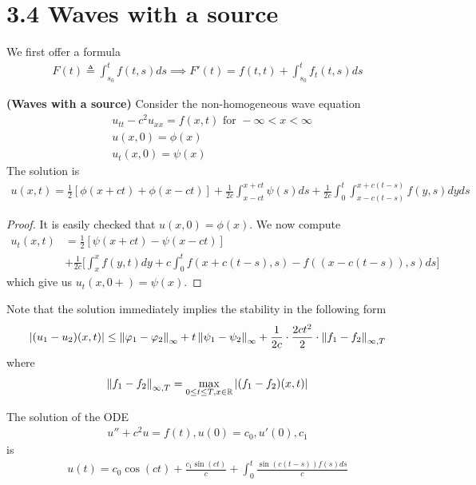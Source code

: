\documentclass{report}
\begin{document}
\section{3.4 Waves with a source}
\begin{mdframed}
We first offer a formula  
\begin{align*}
F(t)\triangleq \int_{s_0}^tf(t,s)ds \implies F'(t)= f(t,t)+ \int_{s_0}^t f_t(t,s)ds
\end{align*}
\end{mdframed}
\begin{theorem}
\textbf{(Waves with a source)} Consider the non-homogeneous wave equation  
\begin{align*}
&u_{tt}-c^2u_{xx}=f(x,t)\text{ for }-\infty < x< \infty\\
&u(x,0)= \phi (x) \\
&u_t(x,0)=\psi (x)
\end{align*}
The solution is 
\begin{align*}
u(x,t)= \frac{1}{2}[\phi (x+ct)+ \phi (x-ct)] + \frac{1}{2c}\int_{x-ct}^{x+ct}\psi (s)ds + \frac{1}{2c}\int_0^t \int_{x-c(t-s)}^{x+c(t-s)}f(y,s)dyds
\end{align*}
\end{theorem}
\begin{proof}
It is easily checked that $u(x,0)=\phi (x)$. We now compute 
\begin{align*}
  u_t(x,t)&=\frac{1}{2}[\psi (x+ct)- \psi (x-ct)]\\
  &+ \frac{1}{2c}\Big[\int^{x}_{x}f(y,t)dy+c\int_0^t f(x+c(t-s),s) -f((x-c(t-s)),s)ds \Big]
\end{align*}
which give us $u_t(x,0+)=\psi (x)$. 
\end{proof}
\begin{mdframed}
Note that the solution immediately implies the stability in the following form 
\begin{align*}
\left|(u_1-u_2)(x,t)\right|\leq \left\| \varphi_1-\varphi_2 \right\|_{\infty} + t \left\| \psi_1-\psi_2 \right\|_\infty +  \frac{1}{2c}\cdot \frac{2ct^2}{2}\cdot \left\| f_1-f_2 \right\|_{\infty ,T}
\end{align*}
where 
\begin{align*}
\left\| f_1-f_2 \right\|_{\infty,T}= \max_{0\leq  t\leq T,x\in\mathbb{R}} \left|(f_1-f_2)(x,t)\right|
\end{align*}
\end{mdframed}
\begin{mdframed}
The solution of the ODE 
\begin{align*}
  u''+c^2u=f(t),u(0)=c_0,u'(0),c_1
\end{align*}
is 
\begin{align*}
u(t)= c_0\cos (ct)+ \frac{c_1 \sin (ct)}{c}+ \int_0^t \frac{\sin (c(t-s)) f(s)ds}{c}
\end{align*}
\end{mdframed}
\end{document}
